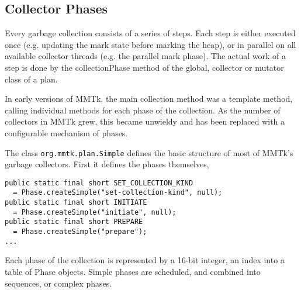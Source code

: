 \subsection{Collector Phases}

Every garbage collection consists of a series of steps.  
Each step is either executed once (e.g. updating the mark 
state before marking the heap), or in parallel on all 
available collector threads (e.g. the parallel mark phase).  
The actual work of a step is done by the collectionPhase 
method of the global, collector or mutator class of a plan.

In early versions of MMTk, the main collection method was a template method, 
calling individual methods for each phase of the collection.  As the number 
of collectors in MMTk grew, this became unwieldy and has been 
replaced with a configurable mechanism of phases.  

The class \lstinline|org.mmtk.plan.Simple| defines the basic structure of most
of MMTk's garbage collectors.  First it defines the phases themselves,

\begin{lstlisting}[name=Simple.java,caption=\lstname: definition of simple
phases.,label=fig:gc:simplephase] 
public static final short SET_COLLECTION_KIND 
  = Phase.createSimple("set-collection-kind", null);
public static final short INITIATE            
  = Phase.createSimple("initiate", null);
public static final short PREPARE             
  = Phase.createSimple("prepare");
...
\end{lstlisting}
Each phase of the collection is represented by a 16-bit integer, 
an index into a table of Phase objects.  Simple phases are scheduled, 
and combined into sequences, or complex phases.


